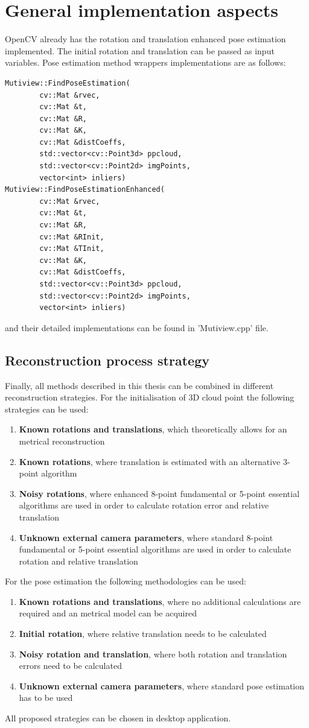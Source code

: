 \section{General implementation aspects}
OpenCV already has the rotation and translation enhanced pose estimation implemented. The initial rotation and translation can be passed as input variables. Pose estimation method wrappers implementations are as follows: 
\begin{lstlisting}
Mutiview::FindPoseEstimation(
        cv::Mat &rvec,
        cv::Mat &t,
        cv::Mat &R,
        cv::Mat &K,
        cv::Mat &distCoeffs,
        std::vector<cv::Point3d> ppcloud,
        std::vector<cv::Point2d> imgPoints,
        vector<int> inliers) 
Mutiview::FindPoseEstimationEnhanced(
        cv::Mat &rvec,
        cv::Mat &t,
        cv::Mat &R,
        cv::Mat &RInit,
        cv::Mat &TInit,
        cv::Mat &K,
        cv::Mat &distCoeffs,
        std::vector<cv::Point3d> ppcloud,
        std::vector<cv::Point2d> imgPoints,
        vector<int> inliers)
\end{lstlisting}
and their detailed implementations can be found in 'Mutiview.cpp' file.

\subsection{Reconstruction process strategy}
Finally, all methods described in this thesis can be combined in different reconstruction strategies. For the initialisation of 3D cloud point the following strategies can be used:
\begin{enumerate} 
\item \textbf{Known rotations and translations}, which theoretically allows for an metrical reconstruction
\item \textbf{Known rotations}, where translation is estimated with an alternative 3-point algorithm
\item \textbf{Noisy rotations}, where enhanced 8-point fundamental or 5-point essential algorithms are used in order to calculate rotation error and relative translation 
\item \textbf{Unknown external camera parameters}, where standard 8-point fundamental or 5-point essential algorithms are used in order to calculate rotation and relative translation
\end{enumerate}
For the pose estimation the following methodologies can be used:
\begin{enumerate}
\item \textbf{Known rotations and translations}, where no additional calculations are required and an metrical model can be acquired
\item \textbf{Initial rotation}, where relative translation needs to be calculated
\item \textbf{Noisy rotation and translation}, where both rotation and translation errors need to be calculated
\item \textbf{Unknown external camera parameters}, where standard pose estimation has to be used
\end{enumerate}
All proposed strategies can be chosen in desktop application.
